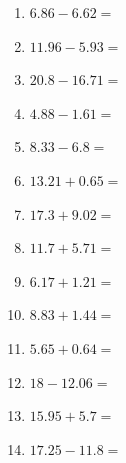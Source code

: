 \documentclass[12pt]{article}
\begin{document}
\begin{enumerate}
\item \large $ 6.86 - 6.62 = $ \vspace{1.5cm}
\item \large $ 11.96 - 5.93 = $ \vspace{1.5cm}
\item \large $ 20.8 - 16.71 = $ \vspace{1.5cm}
\item \large $ 4.88 - 1.61 = $ \vspace{1.5cm}
\newpage
\item \large $ 8.33 - 6.8 = $ \vspace{1.5cm}
\item \large $ 13.21 + 0.65 = $ \vspace{1.5cm}
\item \large $ 17.3 + 9.02 = $ \vspace{1.5cm}
\item \large $ 11.7 + 5.71 = $ \vspace{1.5cm}
\item \large $ 6.17 + 1.21 = $ \vspace{1.5cm}
\item \large $ 8.83 + 1.44 = $ \vspace{1.5cm}
\item \large $ 5.65 + 0.64 = $ \vspace{1.5cm}
\item \large $ 18 - 12.06 = $ \vspace{1.5cm}
\item \large $ 15.95 + 5.7 = $ \vspace{1.5cm}
\item \large $ 17.25 - 11.8 = $ \vspace{1.5cm}
\end{enumerate}\newpage
\end{document}
